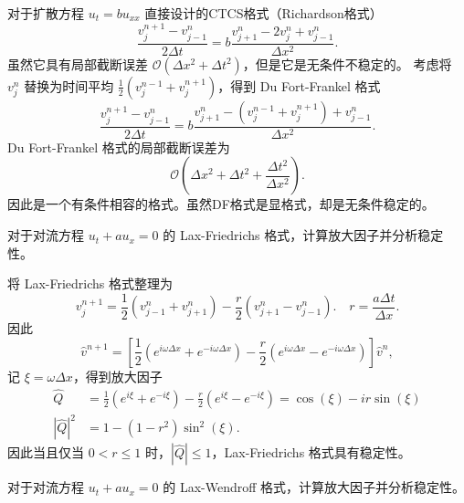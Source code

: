 对于扩散方程 $u_t = b u_{xx}$ 直接设计的CTCS格式（Richardson格式）
\[
    \frac{v_j^{n+1}-v_{j-1}^n}{2\Delta t} = b \frac{v_{j+1}^n - 2 v_j^n + v_{j-1}^n}{\Delta x^2}.
\]
虽然它具有局部截断误差 $\mathcal{O}(\Delta x^2+\Delta t^2)$，但是它是无条件不稳定的。
考虑将 $v_j^n$ 替换为时间平均 $\frac12(v_j^{n-1} + v_j^{n+1})$，得到 Du Fort-Frankel 格式
\[
    \frac{v_j^{n+1}-v_{j-1}^n}{2\Delta t} = b \frac{v_{j+1}^n - (v_{j}^{n-1}+v_j^{n+1}) + v_{j-1}^n}{\Delta x^2}.
\]
Du Fort-Frankel 格式的局部截断误差为
\[
    \mathcal{O}\left(\Delta x^2 + \Delta t^2 + \frac{\Delta t^2}{\Delta x^2}\right).
\]
因此是一个有条件相容的格式。虽然DF格式是显格式，却是无条件稳定的。


\begin{example}
    对于对流方程 $u_t + a u_{x} = 0$ 的 Lax-Friedrichs 格式，计算放大因子并分析稳定性。
\end{example}

\begin{solution*}
    将 Lax-Friedrichs 格式整理为
    \[
        v_{j}^{n+1} = \frac{1}2 (v_{j-1}^n + v_{j+1}^n) - \frac{r}2 (v_{j+1}^n - v_{j-1}^n).
        \quad r = \frac{a \Delta t}{\Delta x}.
    \]
    因此
    \[
        \hat{v}^{n+1} = \left[
            \frac12 (e^{i \omega \Delta x} + e^{- i \omega \Delta x})
            - \frac{r}2 (e^{i \omega \Delta x} - e^{- i \omega \Delta x})
            \right] \hat{v}^n,
    \]
    记 $\xi = \omega \Delta x$，得到放大因子
    \begin{align*}
        \widehat{Q}     & = \frac12 (e^{i \xi} + e^{- i \xi})  - \frac{r}2 (e^{i \xi} - e^{- i \xi}) = \cos(\xi) - i r \sin(\xi)
        \\
        |\widehat{Q}|^2 & =  1 - (1-r^2) \sin^2(\xi).
    \end{align*}
    因此当且仅当 $0 < r \le 1$ 时，$|\widehat{Q}| \le 1$，Lax-Friedrichs 格式具有稳定性。
\end{solution*}

\begin{example}
    对于对流方程 $u_t + a u_{x} = 0$ 的 Lax-Wendroff 格式，计算放大因子并分析稳定性。
\end{example}

